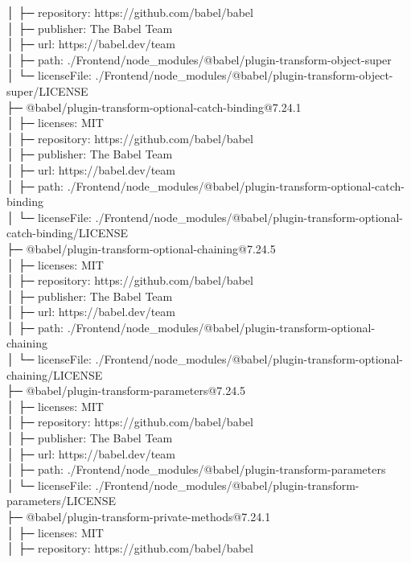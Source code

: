 │  ├─ repository: https://github.com/babel/babel\\
│  ├─ publisher: The Babel Team\\
│  ├─ url: https://babel.dev/team\\
│  ├─ path: ./Frontend/node\_modules/@babel/plugin-transform-object-super\\
│  └─ licenseFile: ./Frontend/node\_modules/@babel/plugin-transform-object-super/LICENSE\\
├─ @babel/plugin-transform-optional-catch-binding@7.24.1\\
│  ├─ licenses: MIT\\
│  ├─ repository: https://github.com/babel/babel\\
│  ├─ publisher: The Babel Team\\
│  ├─ url: https://babel.dev/team\\
│  ├─ path: ./Frontend/node\_modules/@babel/plugin-transform-optional-catch-binding\\
│  └─ licenseFile: ./Frontend/node\_modules/@babel/plugin-transform-optional-catch-binding/LICENSE\\
├─ @babel/plugin-transform-optional-chaining@7.24.5\\
│  ├─ licenses: MIT\\
│  ├─ repository: https://github.com/babel/babel\\
│  ├─ publisher: The Babel Team\\
│  ├─ url: https://babel.dev/team\\
│  ├─ path: ./Frontend/node\_modules/@babel/plugin-transform-optional-chaining\\
│  └─ licenseFile: ./Frontend/node\_modules/@babel/plugin-transform-optional-chaining/LICENSE\\
├─ @babel/plugin-transform-parameters@7.24.5\\
│  ├─ licenses: MIT\\
│  ├─ repository: https://github.com/babel/babel\\
│  ├─ publisher: The Babel Team\\
│  ├─ url: https://babel.dev/team\\
│  ├─ path: ./Frontend/node\_modules/@babel/plugin-transform-parameters\\
│  └─ licenseFile: ./Frontend/node\_modules/@babel/plugin-transform-parameters/LICENSE\\
├─ @babel/plugin-transform-private-methods@7.24.1\\
│  ├─ licenses: MIT\\
│  ├─ repository: https://github.com/babel/babel\\
